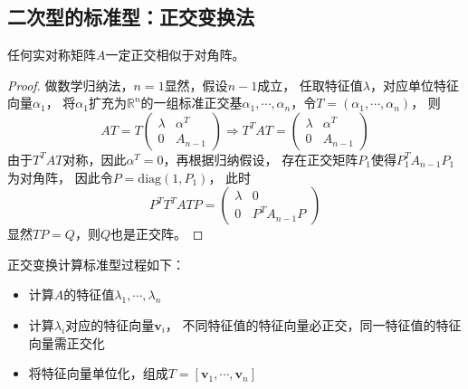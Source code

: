 \subsection{二次型的标准型：正交变换法}

\begin{theorem}[正交对角化的可行性]
  任何实对称矩阵$A$一定正交相似于对角阵。
\end{theorem}

\begin{proof}
  做数学归纳法，$n = 1$显然，假设$n - 1$成立，
  任取特征值$\lambda$，对应单位特征向量$\alpha_1$，
  将$\alpha_1$扩充为$\mathbb{R}^n$的一组标准正交基$\alpha_1,\cdots,\alpha_n$，令$T = (\alpha_1,\cdots,\alpha_n)$，
  则
  \begin{equation*}
    AT = T \left(
      \begin{array}{cc}
        \lambda&\alpha^T\\
        0&A_{n-1}
      \end{array}
    \right) \Rightarrow T^T AT = \left(
      \begin{array}{cc}
        \lambda&\alpha^T \\
        0&A_{n-1}
      \end{array}
    \right)
  \end{equation*}
  由于$T^TAT$对称，因此$\alpha^T = 0$，再根据归纳假设，
  存在正交矩阵$P_1$使得$P_1^TA_{n-1}P_1$为对角阵，
  因此令$P = \mathrm{diag}(1, P_1)$，
  此时
  \begin{equation*}
    P^TT^TATP = \left(
      \begin{array}{cc}
        \lambda&0\\
        0&P^TA_{n-1}P
      \end{array}
    \right)
  \end{equation*}
  显然$TP = Q$，则$Q$也是正交阵。
\end{proof}



\begin{theorem}
  正交变换计算标准型过程如下：
  \begin{itemize}
  \item 计算$A$的特征值$\lambda_1,\cdots,\lambda_n$
  \item 计算$\lambda_i$对应的特征向量$\mathbf{v}_i$，
    不同特征值的特征向量必正交，同一特征值的特征向量需正交化
  \item 将特征向量单位化，组成$T = [\mathbf{v}_1,\cdots,\mathbf{v}_n]$
  \end{itemize}
\end{theorem}

